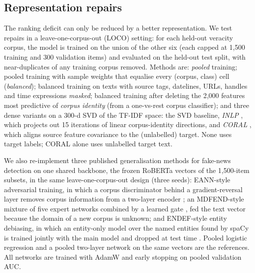 \subsection{Representation repairs}\label{sec:repair}
The ranking deficit can only be reduced by a better representation. We test repairs in a leave-one-corpus-out (LOCO) setting: for each held-out veracity corpus, the model is trained on the union of the other six (each capped at 1{,}500 training and 300 validation items) and evaluated on the held-out test split, with near-duplicates of any training corpus removed. Methods are: \emph{pooled} training; pooled training with sample weights that equalise every (corpus, class) cell (\emph{balanced}); balanced training on texts with source tags, datelines, URLs, handles and time expressions \emph{masked}; balanced training after deleting the 2{,}000 features most predictive of \emph{corpus identity} (from a one-vs-rest corpus classifier); and three dense variants on a 300-d SVD of the TF-IDF space: the SVD baseline, \emph{INLP} \citep{ravfogel2020inlp}, which projects out 15 iterations of linear corpus-identity directions, and \emph{CORAL} \citep{sun2016coral}, which aligns source feature covariance to the (unlabelled) target. None uses target labels; CORAL alone uses unlabelled target text.

We also re-implement three published generalisation methods for fake-news detection on one shared backbone, the frozen RoBERTa vectors of the 1{,}500-item subsets, in the same leave-one-corpus-out design (three seeds): EANN-style adversarial training, in which a corpus discriminator behind a gradient-reversal layer removes corpus information from a two-layer encoder \citep{wang2018eann,ganin2016dann}; an MDFEND-style mixture of five expert networks combined by a learned gate \citep{nan2021mdfend}, fed the text vector because the domain of a new corpus is unknown; and ENDEF-style entity debiasing, in which an entity-only model over the named entities found by spaCy is trained jointly with the main model and dropped at test time \citep{zhu2022endef}. Pooled logistic regression and a pooled two-layer network on the same vectors are the references. All networks are trained with AdamW and early stopping on pooled validation AUC.
